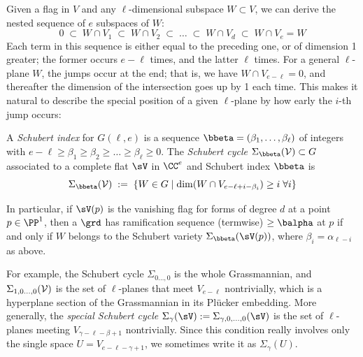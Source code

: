Given a flag in $V$ and any  $\ell$-dimensional subspace $W \subset V$, we can derive the nested sequence of $e$ subspaces of $W$:
$$
0 \; \subset \; W \cap V_1 \; \subset \;  W \cap V_2 \; \subset \;  \dots \; \subset \;  W \cap V_d \; \subset \;  W \cap V_{e} = W
$$
Each term in this sequence is either equal to the preceding one, or of dimension 1 greater; the former  occurs $e-\ell$ times, and the latter $\ell$ times. For a general $\ell $-plane $W$, the jumps occur at the end; that is, we have $W \cap V_{e-\ell} = 0$, and thereafter the dimension of the intersection goes up by 1 each time. This makes it natural
to describe the special position of a given $\ell $-plane by how early the $i$-th jump occurs: 

\begin{definition}
A \emph{Schubert index} for $G(\ell, e)$ is a sequence ${\bbeta} = (\beta_1,\dots,\beta_{\ell})$ of integers with $e-\ell \geq \beta_1 \geq \beta_2 \geq \dots \geq \beta_{\ell} \geq 0$.
The \emph{Schubert cycle $\Sigma_{\bbeta}({\cal V}) \subset G$} associated to a complete flat $\sV$ in $\CC^e$ and
Schubert index $\bbeta$  is 
$$
\Sigma_{\bbeta}({\cal V}) \; := \; \left\{ W \in G \mid \dim(W \cap V_{e-\ell+i-\beta_i}) \geq i \; \forall i \right\}
$$
\end{definition}
In particular, if $\sV(p)$ is the vanishing flag for forms of degree $d$ at a point $p\in \PP^{1}$, then
a $\grd$ has ramification sequence (termwise) $\geq \balpha$ at $p$ if and only if $W$ belongs
to the Schubert variety $\Sigma_{\bbeta}(\sV(p))$, where $\beta_{i} = \alpha_{\ell-i}$ as above.



 
For example, the Schubert cycle $\Sigma_{0\dots,0}$ is the whole Grassmannian, 
and $\Sigma_{1,0\dots,0}(\cal V)$ is the set of $\ell$-planes that meet $V_{e-\ell}$ nontrivially, which is
a hyperplane section of the Grassmannian in its Pl\"ucker embedding. 
More generally, the
\emph{special Schubert cycle} 
$\Sigma_\gamma(\sV) := \Sigma_{\gamma,0,\dots, 0}(\sV)$ 
is the set of $\ell$-planes
meeting  $V_{\gamma-\ell - \beta+1}$ nontrivially.
Since this condition really involves only the single space $U = V_{e-\ell-\gamma+1}$, we sometimes 
 write it
as $\Sigma_\gamma(U)$. 

